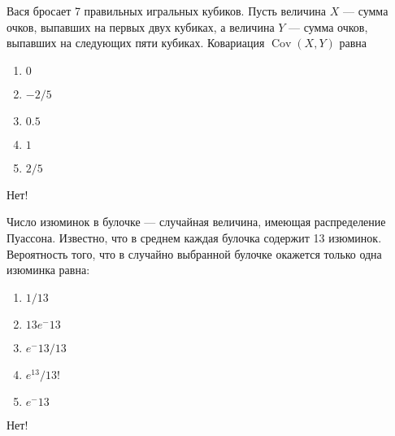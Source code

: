 \documentclass[t]{beamer}
\DeclareMathOperator{\Cov}{Cov}
\begin{document}
 \begin{frame} \label{11-No} 
\begin{block}{11} 

Вася бросает 7 правильных игральных кубиков. Пусть величина  $X$ — сумма очков, выпавших на первых двух кубиках, а величина  $Y$ — сумма очков, выпавших на следующих пяти кубиках. Ковариация $\Cov(X,Y)$ равна
 


 \end{block} 
\begin{enumerate} 
\item[] \hyperlink{11-Yes}{\beamergotobutton{} $0$}
\item[] \hyperlink{11-No}{\beamergotobutton{} $-2/5$
}
\item[] \hyperlink{11-No}{\beamergotobutton{} $0.5$}
\item[] \hyperlink{11-No}{\beamergotobutton{} $1$}
\item[] \hyperlink{11-No}{\beamergotobutton{} $2/5$}
\end{enumerate} 

 \alert{Нет!} 
\end{frame} 


 \begin{frame} \label{12-No} 
\begin{block}{12} 

Число изюминок в булочке — случайная величина, имеющая распределение Пуассона. Известно, что в среднем каждая булочка содержит 13 изюминок. Вероятность того, что в случайно выбранной булочке окажется только одна изюминка равна:
 


 \end{block} 
\begin{enumerate} 
\item[] \hyperlink{12-No}{\beamergotobutton{} $1/13$}
\item[] \hyperlink{12-Yes}{\beamergotobutton{} $13e^-13$}
\item[] \hyperlink{12-No}{\beamergotobutton{} $e^-13/13$}
\item[] \hyperlink{12-No}{\beamergotobutton{} $e^13/13!$
}
\item[] \hyperlink{12-No}{\beamergotobutton{} $e^-13$}
\end{enumerate} 

 \alert{Нет!} 
\end{frame} 
\end{document}
